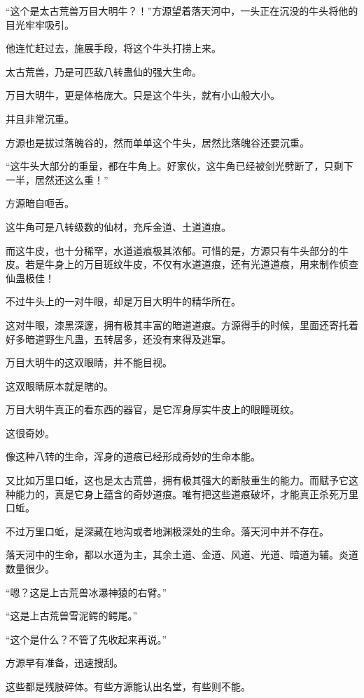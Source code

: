 
\begin{this_body}

“这个是太古荒兽万目大明牛？！”方源望着落天河中，一头正在沉没的牛头将他的目光牢牢吸引。

他连忙赶过去，施展手段，将这个牛头打捞上来。

太古荒兽，乃是可匹敌八转蛊仙的强大生命。

万目大明牛，更是体格庞大。只是这个牛头，就有小山般大小。

并且非常沉重。

方源也是拔过落魄谷的，然而单单这个牛头，居然比落魄谷还要沉重。

“这牛头大部分的重量，都在牛角上。好家伙，这牛角已经被剑光劈断了，只剩下一半，居然还这么重！”

方源暗自咂舌。

这牛角可是八转级数的仙材，充斥金道、土道道痕。

而这牛皮，也十分稀罕，水道道痕极其浓郁。可惜的是，方源只有牛头部分的牛皮。若是牛身上的万目斑纹牛皮，不仅有水道道痕，还有光道道痕，用来制作侦查仙蛊极佳！

不过牛头上的一对牛眼，却是万目大明牛的精华所在。

这对牛眼，漆黑深邃，拥有极其丰富的暗道道痕。方源得手的时候，里面还寄托着好多暗道野生凡蛊，五转居多，还没有来得及逃窜。

万目大明牛的这双眼睛，并不能目视。

这双眼睛原本就是瞎的。

万目大明牛真正的看东西的器官，是它浑身厚实牛皮上的眼瞳斑纹。

这很奇妙。

像这种八转的生命，浑身的道痕已经形成奇妙的生命本能。

又比如万里口蚯，这也是太古荒兽，拥有极其强大的断肢重生的能力。而赋予它这种能力的，真是它身上蕴含的奇妙道痕。唯有把这些道痕破坏，才能真正杀死万里口蚯。

不过万里口蚯，是深藏在地沟或者地渊极深处的生命。落天河中并不存在。

落天河中的生命，都以水道为主，其余土道、金道、风道、光道、暗道为辅。炎道数量很少。

“嗯？这是上古荒兽冰瀑神猿的右臂。”

“这是上古荒兽雪泥鳄的鳄尾。”

“这个是什么？不管了先收起来再说。”

方源早有准备，迅速搜刮。

这些都是残肢碎体。有些方源能认出名堂，有些则不能。


\end{this_body}
